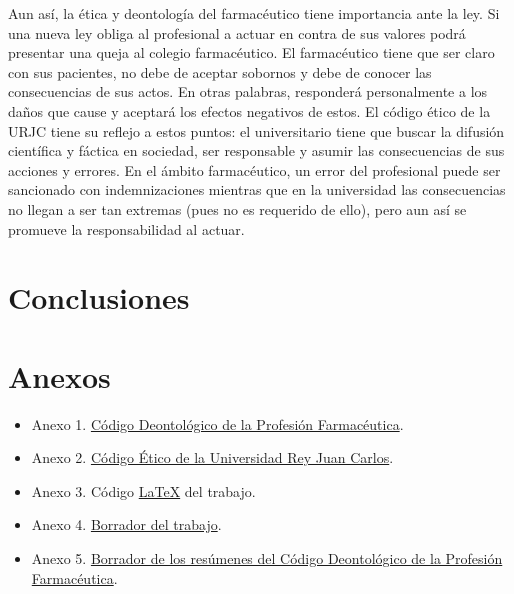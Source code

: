 \documentclass[11pt,a4paper]{article}
\begin{document}
Aun así, la ética y deontología del farmacéutico tiene importancia ante la ley. Si una nueva ley obliga al profesional a actuar en contra de sus valores podrá presentar una queja al colegio farmacéutico. El farmacéutico tiene que ser claro con sus pacientes, no debe de aceptar sobornos y debe de conocer las consecuencias de sus actos. En otras palabras, responderá personalmente a los daños que cause y aceptará los efectos negativos de estos. El código ético de la URJC tiene su reflejo a estos puntos: el universitario tiene que buscar la difusión científica y fáctica en sociedad, ser responsable y asumir las consecuencias de sus acciones y errores. En el ámbito farmacéutico, un error del profesional puede ser sancionado con indemnizaciones mientras que en la universidad las consecuencias no llegan a ser tan extremas (pues no es requerido de ello), pero aun así se promueve la responsabilidad al actuar.

 










\section{Conclusiones}



\pagebreak
\setcounter{secnumdepth}{0}
\section{Anexos}
\begin{itemize}[label = {}]
	\item Anexo 1. \href{https://www.portalfarma.com/Profesionales/organizacionfcolegial/portal-transparencia/Documents/2018-Codigo-Deontologia-Profesion-Farmaceutica-CGCOF.pdf}{Código Deontológico de la Profesión Farmacéutica}.
	\item Anexo 2. \href{https://www.urjc.es/codigoetico}{Código Ético de la Universidad Rey Juan Carlos}.
\item Anexo 3. Código \href{http://www.github.com/DennisDv24}{\LaTeX} del trabajo.
\item Anexo 4. \href{https://docs.google.com/document/d/1JPIhGiP2SUPTwZ42QgbEhY5bHKPIPoN0i3u79ej2DwQ/edit#heading=h.zf8tz9rpog2d}{Borrador del trabajo}.
\item Anexo 5. \href{https://docs.google.com/document/d/1jByW4G1lbvmoq82MXhN4lJDx3bpDZP1n1jSouQVpACU/edit#heading=h.ocedmy22huli}{Borrador de los resúmenes del Código Deontológico de la Profesión Farmacéutica}.
\end{itemize}
\end{document}
